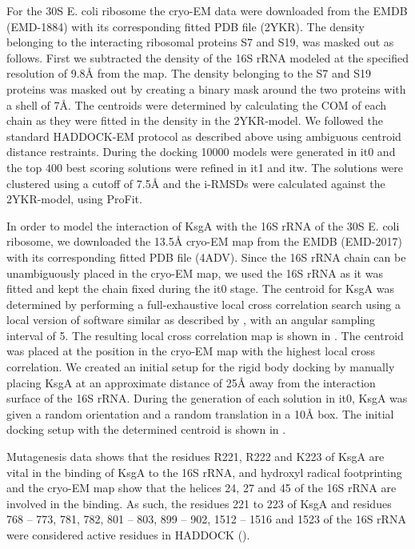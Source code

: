 
For the 30S E. coli ribosome the cryo-EM data were downloaded from the EMDB
(EMD-1884) with its corresponding fitted PDB file (2YKR).  The density
belonging to the interacting ribosomal proteins S7 and S19, was masked out as
follows.  First we subtracted the density of the 16S rRNA modeled at the
specified resolution of 9.8Å from the map.  The density belonging to
the S7 and S19 proteins was masked out by creating a binary mask around the two
proteins with a shell of 7Å.  The centroids were determined by
calculating the COM of each chain as they were fitted in the density in the
2YKR-model.  We followed the standard HADDOCK-EM protocol as described above
using ambiguous centroid distance restraints.  During the docking 10000 models
were generated in it0 and the top 400 best scoring solutions were refined in
it1 and itw.  The solutions were clustered using a cutoff of 7.5Å and
the i-RMSDs were calculated against the 2YKR-model, using ProFit.


In order to model the interaction of KsgA with the 16S rRNA of the 30S E. coli
ribosome, we downloaded the 13.5Å cryo-EM map from the EMDB (EMD-2017)
with its corresponding fitted PDB file (4ADV).  Since the 16S rRNA chain can be
unambiguously placed in the cryo-EM map, we used the 16S rRNA as it was fitted
and kept the chain fixed during the it0 stage.  The centroid for KsgA was
determined by performing a full-exhaustive local cross correlation search using
a local version of software similar as described by \citeauthor{Hoang2013},
with an angular sampling interval of 5\Deg. The resulting local cross
correlation map is shown in .  The centroid was
placed at the position in the cryo-EM map with the highest local cross
correlation.  We created an initial setup for the rigid body docking by
manually placing KsgA at an approximate distance of 25Å away from the
interaction surface of the 16S rRNA.  During the generation of each solution in
it0, KsgA was given a random orientation and a random translation in a
10Å box.  The initial docking setup with the determined centroid is
shown in .

Mutagenesis data shows that the residues R221, R222 and K223 of KsgA are vital
in the binding of KsgA to the 16S rRNA, and hydroxyl radical footprinting and
the cryo-EM map show that the helices 24, 27 and 45 of the 16S rRNA are
involved in the binding.  As such, the residues 221 to 223 of KsgA and residues
768 – 773, 781, 782, 801 – 803, 899 – 902, 1512 – 1516 and 1523 of the 16S rRNA
were considered active residues in HADDOCK
().

